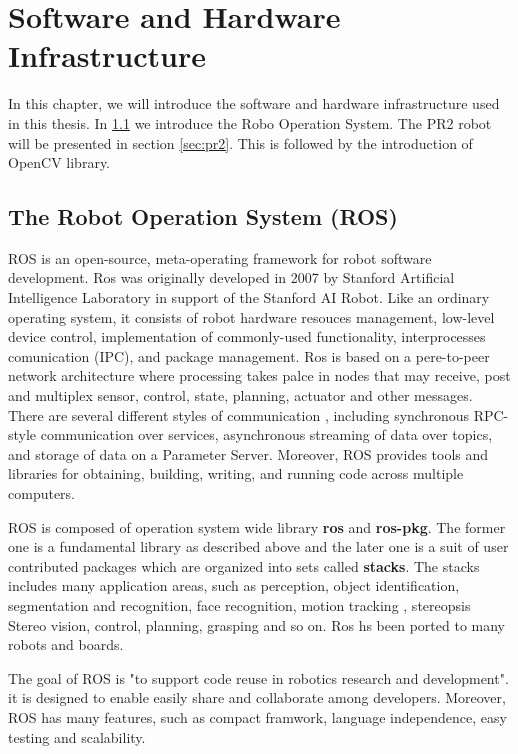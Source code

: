 \chapter{Software and Hardware Infrastructure}
\label{chapter:SHI}
In this chapter, we will introduce the software and hardware
infrastructure used in this thesis. In \ref{sec:ros} we introduce the
Robo Operation System. The PR2 robot will be presented in section
\ref{sec:pr2}. This is followed by the introduction of OpenCV library.

\section{The Robot Operation System (ROS)}
\label{sec:ros}
ROS is an open-source, meta-operating framework for robot software
development. Ros was originally developed in 2007 by Stanford Artificial Intelligence Laboratory in support of the Stanford AI Robot\cite{quigley2007stair}. Like an ordinary operating system, it consists of  robot
hardware resouces management, low-level device control, implementation
of commonly-used functionality, interprocesses comunication (IPC), and package
management. Ros is based on a pere-to-peer network architecture where
processing takes palce in nodes that may receive, post and 
multiplex sensor, control, state, planning, actuator and other
messages. There are several different styles of communication
, including synchronous RPC-style communication over services, asynchronous
streaming of data over topics, and storage of data on a Parameter
Server.
Moreover, ROS provides tools and libraries for obtaining, building, writing, and
running code across multiple computers.

ROS is composed of operation system wide library \textbf{ros} and
\textbf{ros-pkg}. The former one is a fundamental library as described
above and the later one is a suit of user contributed packages which
are organized into sets called \textbf{stacks}. The stacks includes
many application areas, such as  perception, object identification,
segmentation and recognition, face recognition, motion tracking ,
stereopsis Stereo vision, control, planning, grasping and so on. Ros
hs been ported to many robots and boards.

The goal of ROS is "to support code reuse in robotics research and
development"\cite{rosintroduction}.  it is designed to enable easily
share and collaborate among developers. Moreover, ROS has many
features, such as compact framwork, language independence, easy
testing and scalability.

